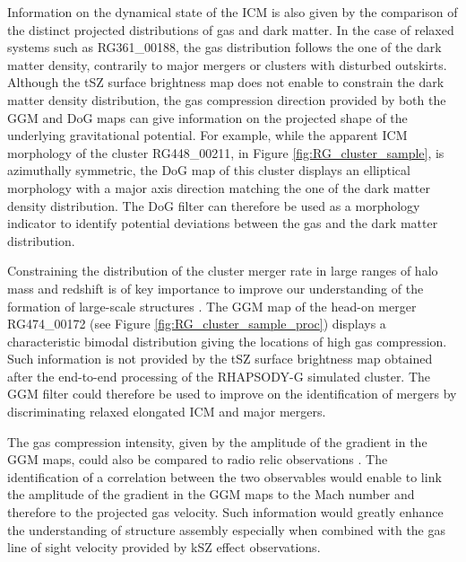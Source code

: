 \documentclass[twocolumn,traditabstract]{aa}
\begin{document}
Information on the dynamical state of the ICM is also given by the comparison of the distinct projected distributions of gas and dark matter. In the case of relaxed systems such as RG361\_00188, the gas distribution follows the one of the dark matter density, contrarily to major mergers or clusters with disturbed outskirts. Although the tSZ surface brightness map does not enable to constrain the dark matter density distribution, the gas compression direction provided by both the GGM and DoG maps can give information on the projected shape of the underlying gravitational potential. For example, while the apparent ICM morphology of the cluster RG448\_00211, in Figure \ref{fig:RG_cluster_sample}, is azimuthally symmetric, the DoG map of this cluster displays an elliptical morphology with a major axis direction matching the one of the dark matter density distribution. The DoG filter can therefore be used as a morphology indicator to identify potential deviations between the gas and the dark matter distribution.

Constraining the distribution of the cluster merger rate in large ranges of halo mass and redshift is of key importance to improve our understanding of the formation of large-scale structures \citep[e.g.][]{Cassano2016}. The GGM map of the head-on merger RG474\_00172 (see Figure \ref{fig:RG_cluster_sample_proc}) displays a characteristic bimodal distribution giving the locations of high gas compression. Such information is not provided by the tSZ surface brightness map obtained after the end-to-end processing of the RHAPSODY-G simulated cluster. The GGM filter could therefore be used to improve on the identification of mergers by discriminating relaxed elongated ICM and major mergers. 

The gas compression intensity, given by the amplitude of the gradient in the GGM maps, could also be compared to radio relic observations \citep[e.g.][]{vanWeeren2010}. The identification of a correlation between the two observables would enable to link the amplitude of the gradient in the GGM maps to the Mach number and therefore to the projected gas velocity. Such information would greatly enhance the understanding of structure assembly especially when combined with the gas line of sight velocity provided by kSZ effect observations.

\end{document}
